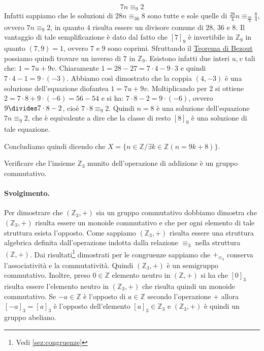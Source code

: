 \begin{displaymath}
	7n \equiv_{9} 2
\end{displaymath}
Infatti sappiamo che le soluzioni di $28n \equiv_{36} 8$ sono tutte e sole quelle di $\frac{28}{4}n \equiv_{\frac{36}{4}} \frac{8}{4}$, ovvero $7n \equiv_{9} 2$, in quanto $4$ risulta essere un divisore comune di $28$, $36$ e $8$. Il vantaggio di tale semplificazione è dato dal fatto che $[7]_{9}$ è invertibile in $\mathbb{Z}_{9}$ in quanto $(7,9)=1$, ovvero 7 e 9 sono coprimi. Sfruttando il \hyperlink{thm:bezout}{Teorema di Bezout} possiamo quindi trovare un inverso di 7 in $\mathbb{Z}_{9}$. Esistono infatti due interi $u,v$ tali che: $1 = 7u+9v$. Chiaramente $1 = 28-27 =7 \cdot 4 - 9 \cdot 3$ e quindi $7 \cdot 4 -1 = 9 \cdot (-3)$. Abbiamo così dimostrato che la coppia $(4,-3)$ è una soluzione dell'equazione diofantea $1=7u+9v$. Moltiplicando per 2 si ottiene $2=7 \cdot 8  + 9 \cdot (-6) =56-54$ e si ha: $7 \cdot 8 -2 = 9 \cdot (-6)$, ovvero $9 \divides 7 \cdot 8 - 2$, cioè  $7 \cdot 8 \equiv_{9} 2$. Quindi $n=8$ è una soluzione dell'equazione $7n \equiv_{9} 2$, che è equivalente a dire che la classe di resto $[8]_{9}$ è una soluzione di tale equazione.

Concludiamo quindi dicendo che $X = \{n \in \mathbb{Z} / \exists k \in \mathbb{Z} (n = 9k+ 8)\}$. \hfill \blacksquare

\begin{exsbox}
	Verificare che l'insieme $\mathbb{Z}_{3}$ munito dell'operazione di addizione è un gruppo commutativo.
\end{exsbox}

\paragraph{Svolgimento.} Per dimostrare che $(\mathbb{Z}_{3},+)$ sia un gruppo commutativo dobbiamo dimostra che $(\mathbb{Z}_{3},+)$ risulta essere un monoide commutativo e che per ogni elemento di tale struttura esista l'opposto.
Come sappiamo $(\mathbb{Z}_{3},+)$ risulta essere una struttura algebrica definita dall'operazione indotta dalla relazione $\equiv_{3}$ nella struttura $(\mathbb{Z},+)$. Dai risultati\footnote{Vedi \ref{sez:congruenze}} dimostrati per le congruenze sappiamo che $+_{\equiv_{3}}$ conserva l'associatività e la commutatività. Quindi $(\mathbb{Z}_{3},+)$ è un semigruppo commutativo. Inoltre, preso $0 \in \mathbb{Z}$ elemento neutro in $(\mathbb{Z},+)$ si ha che $[0]_{3}$ risulta essere l'elemento neutro in $(\mathbb{Z}_{3},+)$ che risulta quindi un monoide commutativo. Se $-a \in \mathbb{Z}$ è l'opposto di $a \in \mathbb{Z}$ secondo l'operazione $+$ allora $[-a]_{3} = [a]_{3}$ è l'opposto dell'elemento $[a]_{3} \in \mathbb{Z}_{3}$ e $(\mathbb{Z}_{3},+)$ è quindi un gruppo abeliano. \hfill \blacksquare

